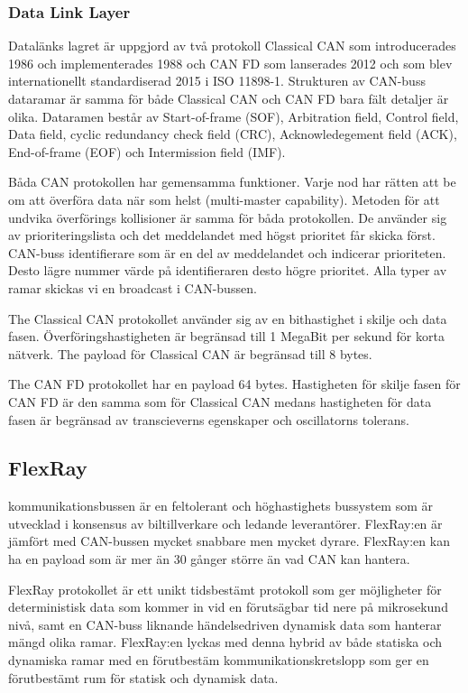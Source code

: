 \documentclass[a4paper]{IEEEtran}
\begin{document}
\subsubsection{Data Link Layer}
Datalänks lagret är uppgjord av två protokoll Classical CAN som introducerades 1986 och implementerades 1988 och CAN FD som lanserades 2012 och som blev internationellt standardiserad 2015 i ISO 11898-1. Strukturen av CAN-buss dataramar är samma för både Classical CAN och CAN FD bara fält detaljer är olika. Dataramen består av Start-of-frame (SOF), Arbitration field, Control field, Data field, cyclic redundancy check field (CRC), Acknowledegement field (ACK), End-of-frame (EOF) och Intermission field (IMF). 

Båda CAN protokollen har gemensamma funktioner. Varje nod har rätten att be om att överföra data när som helst (multi-master capability). Metoden för att undvika överförings kollisioner är samma för båda protokollen. De använder sig av prioriteringslista och det meddelandet med högst prioritet får skicka först. CAN-buss identifierare som är en del av meddelandet och indicerar prioriteten. Desto lägre nummer värde på identifieraren desto högre prioritet. Alla typer av ramar skickas vi en broadcast i CAN-bussen. 

The Classical CAN protokollet använder sig av en bithastighet i skilje och data fasen. Överföringshastigheten är begränsad till 1 MegaBit per sekund för korta nätverk. The payload för Classical CAN är begränsad till 8 bytes.

The CAN FD protokollet har en payload 64 bytes. Hastigheten för skilje fasen för CAN FD är den samma som för Classical CAN medans hastigheten för data fasen är begränsad av transcieverns egenskaper och oscillatorns tolerans. \cite{CANdata}

\subsection{FlexRay} \label{sec:FlexRay}
kommunikationsbussen är en feltolerant och höghastighets bussystem som är utvecklad i konsensus av biltillverkare och ledande leverantörer. 
FlexRay:en är jämfört med CAN-bussen mycket snabbare men mycket dyrare. 
FlexRay:en kan ha en payload som är mer än 30 gånger större än vad CAN kan hantera.

FlexRay protokollet är ett unikt tidsbestämt protokoll som ger möjligheter för deterministisk data som kommer in vid en förutsägbar tid nere på mikrosekund nivå, samt en CAN-buss liknande händelsedriven dynamisk data som hanterar mängd olika ramar. 
FlexRay:en lyckas med denna hybrid av både statiska och dynamiska ramar med en förutbestäm kommunikationskretslopp som ger en förutbestämt rum för statisk och dynamisk data. 
\end{document}
